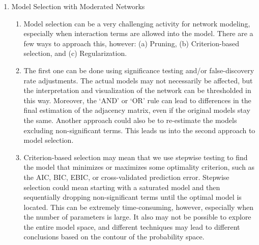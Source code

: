 \begin{enumerate}
\begin{enumerate}
        \item With nodewise regression, we estimate the network by testing a series of regression models where each node is the outcome of one model. Then, we aggregate the coefficients across the models in order to estimate the network structure. When there are only main effects in the regression models, we can estimate partial correlations directly from the regression coefficients, even when covariates are included in the models (assuming they are included in all models). When interaction terms are included, however, it is not possible to estimate exact partial correlations, but we can approximate them very closely using terms that have a similar interpretation.
        \item Here's an example of how this would work. Blah blah, estimate each model, then aggregate using the `AND' or `OR' rule to combine coefficients. We can do this for interaction terms as well, although this may not be desirable, and would also require that we model the moderator as a variable in the network. Instead, we may be interested in modeling the moderator as an exogenous variable that influences the network structure but is not affected by it. 
        \item Here's how we can interpret these models. Plots of conditional effects, overall graphical structure, and confidence intervals for estimating marginal effects.
    \end{enumerate}
    \item Model Selection with Moderated Networks
    \begin{enumerate}
        \item Model selection can be a very challenging activity for network modeling, especially when interaction terms are allowed into the model. There are a few ways to approach this, however: (a) Pruning, (b) Criterion-based selection, and (c) Regularization. 
        \item The first one can be done using significance testing and/or false-discovery rate adjustments. The actual models may not necessarily be affected, but the interpretation and visualization of the network can be thresholded in this way. Moreover, the `AND' or `OR' rule can lead to differences in the final estimation of the adjacency matrix, even if the original models stay the same. Another approach could also be to re-estimate the models excluding non-significant terms. This leads us into the second approach to model selection.
        \item Criterion-based selection may mean that we use stepwise testing to find the model that minimizes or maximizes some optimality criterion, such as the AIC, BIC, EBIC, or cross-validated prediction error. Stepwise selection could mean starting with a saturated model and then sequentially dropping non-significant terms until the optimal model is located. This can be extremely time-consuming, however, especially when the number of parameters is large. It also may not be possible to explore the entire model space, and different techniques may lead to different conclusions based on the contour of the probability space.

\end{enumerate}
\end{enumerate}
